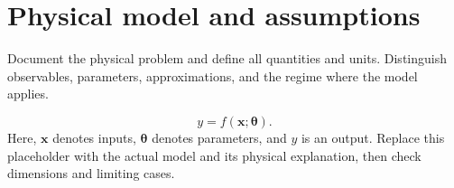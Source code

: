 \section{Physical model and assumptions}
Document the physical problem and define all quantities and units. Distinguish
observables, parameters, approximations, and the regime where the model applies.

\begin{equation}
    y = f(\boldsymbol{x}; \boldsymbol{\theta}).
    \label{eq:notation-placeholder}
\end{equation}
Here, $\boldsymbol{x}$ denotes inputs, $\boldsymbol{\theta}$ denotes parameters,
and $y$ is an output. Replace this placeholder with the actual model and its
physical explanation, then check dimensions and limiting cases.

